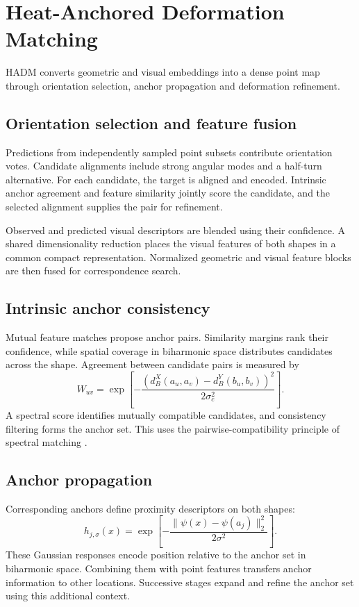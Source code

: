 \section{Heat-Anchored Deformation Matching}
\label{sec:hadm}
HADM converts geometric and visual embeddings into a dense point map through orientation selection, anchor propagation and deformation refinement.

\subsection{Orientation selection and feature fusion}
Predictions from independently sampled point subsets contribute orientation votes. Candidate alignments include strong angular modes and a half-turn alternative. For each candidate, the target is aligned and encoded. Intrinsic anchor agreement and feature similarity jointly score the candidate, and the selected alignment supplies the pair for refinement.

Observed and predicted visual descriptors are blended using their confidence. A shared dimensionality reduction places the visual features of both shapes in a common compact representation. Normalized geometric and visual feature blocks are then fused for correspondence search.

\subsection{Intrinsic anchor consistency}
Mutual feature matches propose anchor pairs. Similarity margins rank their confidence, while spatial coverage in biharmonic space distributes candidates across the shape. Agreement between candidate pairs is measured by
\begin{equation}
 W_{uv}=\exp\left[-\frac{
 (d_B^X(a_u,a_v)-d_B^Y(b_u,b_v))^2}{2\sigma_c^2}\right].
\end{equation}
A spectral score identifies mutually compatible candidates, and consistency filtering forms the anchor set. This uses the pairwise-compatibility principle of spectral matching \citep{Leordeanu_2005_Spectral}.

\subsection{Anchor propagation}
Corresponding anchors define proximity descriptors on both shapes:
\begin{equation}
 h_{j,\sigma}(x)=\exp\left[-\frac{
 \|\psi(x)-\psi(a_j)\|_2^2}{2\sigma^2}\right].
\end{equation}
These Gaussian responses encode position relative to the anchor set in biharmonic space. Combining them with point features transfers anchor information to other locations. Successive stages expand and refine the anchor set using this additional context.

